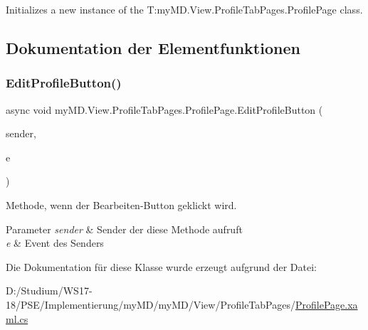 Initializes a new instance of the T\+:my\+M\+D.\+View.\+Profile\+Tab\+Pages.\+Profile\+Page class. 



\subsection{Dokumentation der Elementfunktionen}
\mbox{\label{classmy_m_d_1_1_view_1_1_profile_tab_pages_1_1_profile_page_abab1096a4fd1feed046a0a83cd66ff84}} 
\subsubsection{\texorpdfstring{Edit\+Profile\+Button()}{EditProfileButton()}}
{\footnotesize\ttfamily async void my\+M\+D.\+View.\+Profile\+Tab\+Pages.\+Profile\+Page.\+Edit\+Profile\+Button (\begin{DoxyParamCaption}\item[{object}]{sender,  }\item[{System.\+Event\+Args}]{e }\end{DoxyParamCaption})}



Methode, wenn der Bearbeiten-\/\+Button geklickt wird. 


\begin{DoxyParams}{Parameter}
{\em sender} & Sender der diese Methode aufruft\\
\hline
{\em e} & Event des Senders\\
\hline
\end{DoxyParams}


Die Dokumentation für diese Klasse wurde erzeugt aufgrund der Datei\+:\begin{DoxyCompactItemize}
\item 
D\+:/\+Studium/\+W\+S17-\/18/\+P\+S\+E/\+Implementierung/my\+M\+D/my\+M\+D/\+View/\+Profile\+Tab\+Pages/\mbox{\hyperlink{_profile_page_8xaml_8cs}{Profile\+Page.\+xaml.\+cs}}\end{DoxyCompactItemize}
